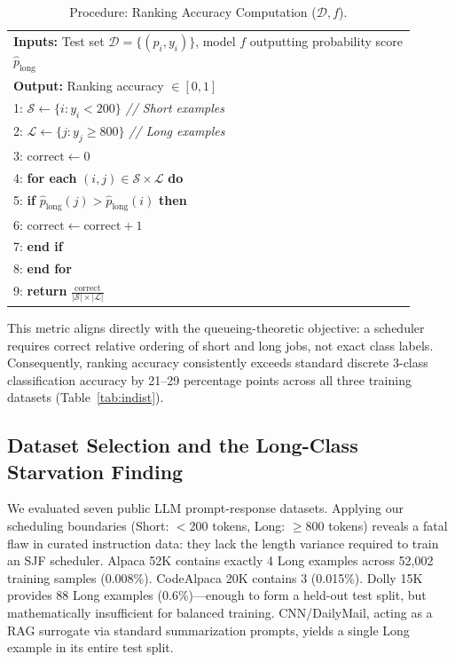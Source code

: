 \documentclass[10pt]{article}
\begin{document}
\begin{table}[H]
\centering
\caption{Procedure: Ranking Accuracy Computation ($\mathcal{D}, f$).}
\label{alg:ranking}
\small
\begin{tabular}{p{0.9\linewidth}}
\toprule
\textbf{Inputs:} Test set $\mathcal{D} = \{(p_i, y_i)\}$, model $f$ outputting probability score $\hat{p}_{\text{long}}$ \\
\textbf{Output:} Ranking accuracy $\in [0,1]$ \\
\midrule
1: $\mathcal{S} \gets \{i : y_i < 200\}$ \hfill \textit{// Short examples} \\
2: $\mathcal{L} \gets \{j : y_j \geq 800\}$ \hfill \textit{// Long examples} \\
3: $\text{correct} \gets 0$ \\
4: \textbf{for each} $(i,j) \in \mathcal{S} \times \mathcal{L}$ \textbf{do} \\
5: \quad \textbf{if} $\hat{p}_{\text{long}}(j) > \hat{p}_{\text{long}}(i)$ \textbf{then} \\
6: \qquad $\text{correct} \gets \text{correct} + 1$ \\
7: \quad \textbf{end if} \\
8: \textbf{end for} \\
9: \textbf{return} $\frac{\text{correct}}{|\mathcal{S}| \times |\mathcal{L}|}$ \\
\bottomrule
\end{tabular}
\end{table}

This metric aligns directly with the queueing-theoretic objective: a scheduler requires correct relative ordering of short and long jobs, not exact class labels. Consequently, ranking accuracy consistently exceeds standard discrete 3-class classification accuracy by 21–29 percentage points across all three training datasets (Table~\ref{tab:indist}).

\subsection{Dataset Selection and the Long-Class Starvation Finding}
\label{sec:datasets}

We evaluated seven public LLM prompt-response datasets. Applying our scheduling boundaries (Short: $<$200 tokens, Long: $\geq$800 tokens) reveals a fatal flaw in curated instruction data: they lack the length variance required to train an SJF scheduler. Alpaca 52K contains exactly 4 Long examples across 52,002 training samples (0.008\%). CodeAlpaca 20K contains 3 (0.015\%). Dolly 15K provides 88 Long examples (0.6\%)—enough to form a held-out test split, but mathematically insufficient for balanced training. CNN/DailyMail, acting as a RAG surrogate via standard summarization prompts, yields a single Long example in its entire test split.
\end{document}
